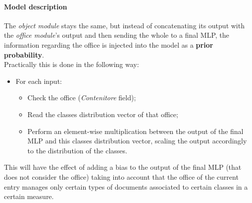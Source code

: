 \documentclass[12pt]{article}
\begin{document}
\paragraph{Model description}
The \textit{object module} stays the same, but instead of concatenating its output with the \textit{office module}'s output and then sending the whole to a final MLP, the information regarding the office is injected into the model as a \textbf{prior probability}.\\
Practically this is done in the following way:
\begin{itemize}
    \item For each input:
    \begin{itemize}
        \item Check the office (\textit{Contenitore} field);
        \item Read the classes distribution vector of that office;
        \item Perform an element-wise multiplication between the output of the final MLP and this classes distribution vector, scaling the output accordingly to the distribution of the classes.
    \end{itemize}
\end{itemize}
This will have the effect of adding a bias to the output of the final MLP (that does not consider the office) taking into account that the office of the current entry manages only certain types of documents associated to certain classes in a certain measure.
\end{document}
